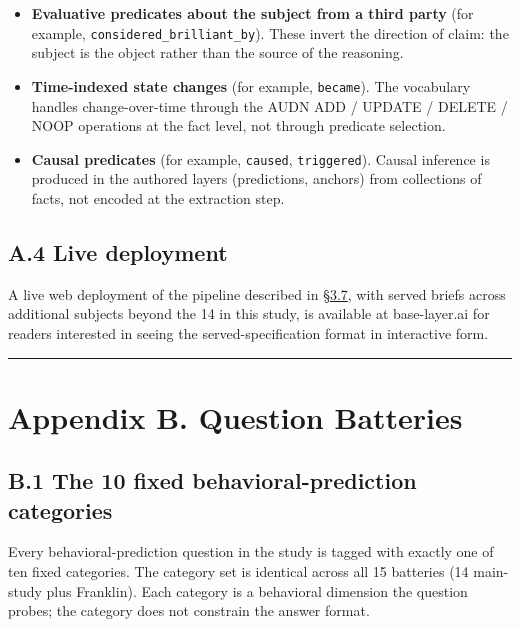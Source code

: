 \begin{itemize}
\tightlist
\item
  \textbf{Evaluative predicates about the subject from a third party}
  (for example, \texttt{considered\_brilliant\_by}). These invert the
  direction of claim: the subject is the object rather than the source
  of the reasoning.
\item
  \textbf{Time-indexed state changes} (for example, \texttt{became}).
  The vocabulary handles change-over-time through the AUDN ADD / UPDATE
  / DELETE / NOOP operations at the fact level, not through predicate
  selection.
\item
  \textbf{Causal predicates} (for example, \texttt{caused},
  \texttt{triggered}). Causal inference is produced in the authored
  layers (predictions, anchors) from collections of facts, not encoded
  at the extraction step.
\end{itemize}

\hypertarget{a.4-live-deployment}{%
\subsection{A.4 Live deployment}\label{a.4-live-deployment}}

A live web deployment of the pipeline described in \hyperref[pipeline-for-the-behavioral-specification]{§3.7}, with served
briefs across additional subjects beyond the 14 in this study, is
available at base-layer.ai for readers interested in seeing the
served-specification format in interactive form.

\begin{center}\rule{0.5\linewidth}{0.5pt}\end{center}

\hypertarget{appendix-b.-question-batteries}{%
\section{Appendix B. Question
Batteries}\label{appendix-b.-question-batteries}}

\hypertarget{b.1-the-10-fixed-behavioral-prediction-categories}{%
\subsection{B.1 The 10 fixed behavioral-prediction
categories}\label{b.1-the-10-fixed-behavioral-prediction-categories}}

Every behavioral-prediction question in the study is tagged with exactly
one of ten fixed categories. The category set is identical across all 15
batteries (14 main-study plus Franklin). Each category is a behavioral
dimension the question probes; the category does not constrain the
answer format.

